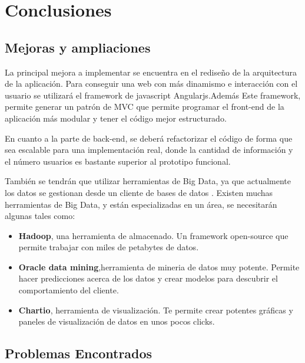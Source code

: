 \chapter{Conclusiones}

\section{Mejoras y ampliaciones}

La principal mejora a implementar se encuentra en el rediseño de la arquitectura de la aplicación. Para conseguir una web con más dinamismo e interacción con el usuario se utilizará el framework de javascript Angularjs.Además Este framework, permite generar un patrón de MVC que permite programar el front-end de la aplicación más modular y tener el código mejor estructurado.

\vspace{5 mm}

En cuanto a la parte de back-end, se deberá refactorizar el código de forma que sea escalable para una implementación real, donde la cantidad de información y el número usuarios es bastante superior al prototipo funcional. 

\vspace{5 mm}

También se tendrán que utilizar herramientas de Big Data, ya que actualmente los datos se gestionan desde un cliente de bases de datos \cite{big-data-tools}. 
Existen muchas herramientas de Big Data, y están especializadas en un área, se necesitarán algunas tales como:


\begin{itemize}
  \item \textbf{Hadoop}, una herramienta de almacenado. Un framework open-source que permite trabajar con miles de petabytes de datos.
  \item \textbf{Oracle data mining},herramienta de mineria de datos muy potente. Permite hacer predicciones acerca de los datos y crear modelos para descubrir el comportamiento del cliente.
  \item \textbf{Chartio}, herramienta de visualización. Te permite crear potentes gráficas y paneles de visualización de datos en unos pocos clicks.
\end{itemize}

\section{Problemas Encontrados}

